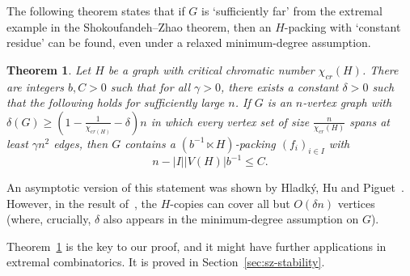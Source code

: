 \documentclass[reqno, 12pt]{amsart}
\numberwithin{equation}{section}
\numberwithin{figure}{section}
\theoremstyle{plain}
\newtheorem{thm}{Theorem}[section]
\theoremstyle{definition}
\begin{document}
    The following theorem states that if $G$ is `sufficiently far' from the extremal example in the Shokoufandeh--Zhao theorem, then an $H$-packing with `constant residue' can be found, even under a relaxed minimum-degree assumption.

        \begin{thm}\label{t:sz-stability}
        Let $H$ be a graph with critical chromatic number $\chi_{cr}(H)$.  There are integers $b,C>0$ such that for all $\gamma>0$, there exists a constant $\delta >0$ such that the following holds for sufficiently large $n$. If $G$ is an $n$-vertex graph with $\delta(G)\geq \left(1-\frac{1}{\chi_{cr(H)}}-\delta\right)n$ in which every vertex set of size $\frac{n}{\chi_{cr}(H)}$ spans at least $\gamma n^2$ edges, then $G$ contains a $(b^{-1} \ltimes H)$-packing $(f_i)_{i \in I}$ with 
         $$n- |I||V(H)|b^{-1}\leq C.$$\end{thm}
        An asymptotic version of this statement was shown by Hladk\'y, Hu and Piguet~\cite[Theorem 1.3]{hhp19}. However, in the result of~\cite{hhp19}, the $H$-copies can cover all but $O(\delta n)$ vertices (where, crucially, $\delta$ also appears in the minimum-degree assumption on $G$).

        Theorem~\ref{t:sz-stability} is the key to our proof, and it might have further applications in extremal combinatorics. It is proved in Section~\ref{sec:sz-stability}.
        

        
         



\end{document}

